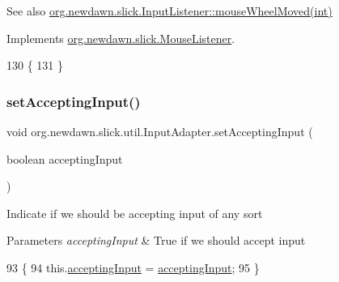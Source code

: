 \begin{DoxySeeAlso}{See also}
\mbox{\hyperlink{interfaceorg_1_1newdawn_1_1slick_1_1_mouse_listener_ad7e49c969e1f0315ecdf238f715953d1}{org.\+newdawn.\+slick.\+Input\+Listener\+::mouse\+Wheel\+Moved(int)}} 
\end{DoxySeeAlso}


Implements \mbox{\hyperlink{interfaceorg_1_1newdawn_1_1slick_1_1_mouse_listener_ad7e49c969e1f0315ecdf238f715953d1}{org.\+newdawn.\+slick.\+Mouse\+Listener}}.


\begin{DoxyCode}
130                                             \{
131     \}
\end{DoxyCode}
\mbox{\label{classorg_1_1newdawn_1_1slick_1_1util_1_1_input_adapter_a482763d527972a4ff65ed6a30c1057b6}} 
\subsubsection{\texorpdfstring{set\+Accepting\+Input()}{setAcceptingInput()}}
{\footnotesize\ttfamily void org.\+newdawn.\+slick.\+util.\+Input\+Adapter.\+set\+Accepting\+Input (\begin{DoxyParamCaption}\item[{boolean}]{accepting\+Input }\end{DoxyParamCaption})\hspace{0.3cm}{\ttfamily [inline]}}

Indicate if we should be accepting input of any sort


\begin{DoxyParams}{Parameters}
{\em accepting\+Input} & True if we should accept input \\
\hline
\end{DoxyParams}

\begin{DoxyCode}
93                                                           \{
94         this.\mbox{\hyperlink{classorg_1_1newdawn_1_1slick_1_1util_1_1_input_adapter_a29236557cf2412c8f843886d2453c650}{acceptingInput}} = \mbox{\hyperlink{classorg_1_1newdawn_1_1slick_1_1util_1_1_input_adapter_a29236557cf2412c8f843886d2453c650}{acceptingInput}};
95     \}
\end{DoxyCode}
\mbox{\label{classorg_1_1newdawn_1_1slick_1_1util_1_1_input_adapter_ab5a715a6c56f677a08be343868877ae3}} 
